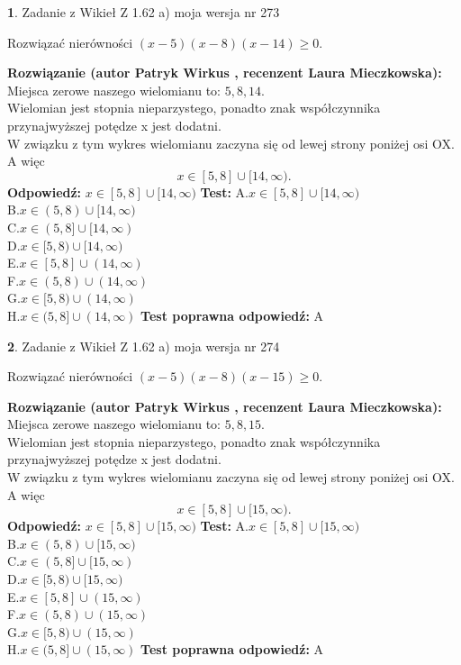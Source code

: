\documentclass[12pt, a4paper]{article}
\theoremstyle{definition} %
\newtheorem{zad}{}
\newcommand{\zadStart}[1]{\begin{zad}#1\newline}
\newcommand{\zadStop}{\end{zad}}
\newcommand{\rozwStart}[2]{\noindent \textbf{Rozwiązanie (autor #1 , recenzent #2): }\newline}
\newcommand{\rozwStop}{\newline}
\newcommand{\odpStart}{\noindent \textbf{Odpowiedź:}\newline}
\newcommand{\odpStop}{\newline}
\newcommand{\testStart}{\noindent \textbf{Test:}\newline}
\newcommand{\testStop}{\newline}
\newcommand{\kluczStart}{\noindent \textbf{Test poprawna odpowiedź:}\newline}
\newcommand{\kluczStop}{\newline}
\begin{document}
\zadStart{Zadanie z Wikieł Z 1.62 a) moja wersja nr 273}

Rozwiązać nierówności $(x-5)(x-8)(x-14)\ge0$.
\zadStop
\rozwStart{Patryk Wirkus}{Laura Mieczkowska}
Miejsca zerowe naszego wielomianu to: $5, 8, 14$.\\
Wielomian jest stopnia nieparzystego, ponadto znak współczynnika przy\linebreak najwyższej potędze x jest dodatni.\\ W związku z tym wykres wielomianu zaczyna się od lewej strony poniżej osi OX. A więc $$x \in [5,8] \cup [14,\infty).$$
\rozwStop
\odpStart
$x \in [5,8] \cup [14,\infty)$
\odpStop
\testStart
A.$x \in [5,8] \cup [14,\infty)$\\
B.$x \in (5,8) \cup [14,\infty)$\\
C.$x \in (5,8] \cup [14,\infty)$\\
D.$x \in [5,8) \cup [14,\infty)$\\
E.$x \in [5,8] \cup (14,\infty)$\\
F.$x \in (5,8) \cup (14,\infty)$\\
G.$x \in [5,8) \cup (14,\infty)$\\
H.$x \in (5,8] \cup (14,\infty)$
\testStop
\kluczStart
A
\kluczStop



\zadStart{Zadanie z Wikieł Z 1.62 a) moja wersja nr 274}

Rozwiązać nierówności $(x-5)(x-8)(x-15)\ge0$.
\zadStop
\rozwStart{Patryk Wirkus}{Laura Mieczkowska}
Miejsca zerowe naszego wielomianu to: $5, 8, 15$.\\
Wielomian jest stopnia nieparzystego, ponadto znak współczynnika przy\linebreak najwyższej potędze x jest dodatni.\\ W związku z tym wykres wielomianu zaczyna się od lewej strony poniżej osi OX. A więc $$x \in [5,8] \cup [15,\infty).$$
\rozwStop
\odpStart
$x \in [5,8] \cup [15,\infty)$
\odpStop
\testStart
A.$x \in [5,8] \cup [15,\infty)$\\
B.$x \in (5,8) \cup [15,\infty)$\\
C.$x \in (5,8] \cup [15,\infty)$\\
D.$x \in [5,8) \cup [15,\infty)$\\
E.$x \in [5,8] \cup (15,\infty)$\\
F.$x \in (5,8) \cup (15,\infty)$\\
G.$x \in [5,8) \cup (15,\infty)$\\
H.$x \in (5,8] \cup (15,\infty)$
\testStop
\kluczStart
A
\kluczStop
\end{document}
